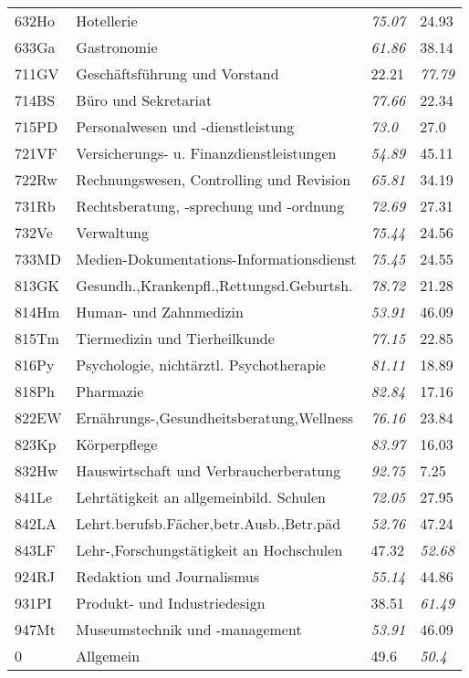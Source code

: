 \begin{longtable}{llll}
632Ho & Hotellerie & \textit{75.07} & 24.93 \\
633Ga & Gastronomie & \textit{61.86} & 38.14 \\
711GV & Geschäftsführung und Vorstand & 22.21 & \textit{77.79} \\
714BS & Büro und Sekretariat & \textit{77.66} & 22.34 \\
715PD & Personalwesen und -dienstleistung & \textit{73.0} & 27.0 \\
721VF & Versicherungs- u. Finanzdienstleistungen & \textit{54.89} & 45.11 \\
722Rw & Rechnungswesen, Controlling und Revision & \textit{65.81} & 34.19 \\
731Rb & Rechtsberatung, -sprechung und -ordnung & \textit{72.69} & 27.31 \\
732Ve & Verwaltung & \textit{75.44} & 24.56 \\
733MD & Medien-Dokumentations-Informationsdienst & \textit{75.45} & 24.55 \\
813GK & Gesundh.,Krankenpfl.,Rettungsd.Geburtsh. & \textit{78.72} & 21.28 \\
814Hm & Human- und Zahnmedizin & \textit{53.91} & 46.09 \\
815Tm & Tiermedizin und Tierheilkunde & \textit{77.15} & 22.85 \\
816Py & Psychologie, nichtärztl. Psychotherapie & \textit{81.11} & 18.89 \\
818Ph & Pharmazie & \textit{82.84} & 17.16 \\
822EW & Ernährungs-,Gesundheitsberatung,Wellness & \textit{76.16} & 23.84 \\
823Kp & Körperpflege & \textit{83.97} & 16.03 \\
832Hw & Hauswirtschaft und Verbraucherberatung & \textit{92.75} & 7.25 \\
841Le & Lehrtätigkeit an allgemeinbild. Schulen & \textit{72.05} & 27.95 \\
842LA & Lehrt.berufsb.Fächer,betr.Ausb.,Betr.päd & \textit{52.76} & 47.24 \\
843LF & Lehr-,Forschungstätigkeit an Hochschulen & 47.32 & \textit{52.68} \\
924RJ & Redaktion und Journalismus & \textit{55.14} & 44.86 \\
931PI & Produkt- und Industriedesign & 38.51 & \textit{61.49} \\
947Mt & Museumstechnik und -management & \textit{53.91} & 46.09 \\
0 & Allgemein & 49.6 & \textit{50.4} \\
\end{longtable}
